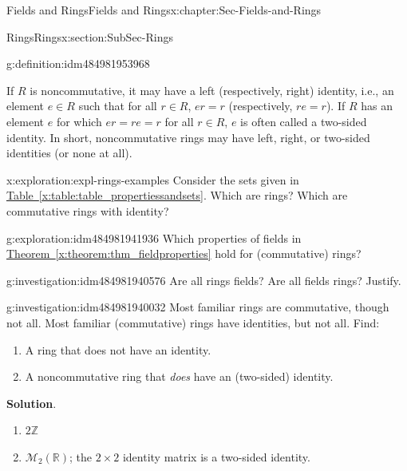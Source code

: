 \documentclass[oneside,10pt,]{book}
\newcommand{\blocktitlefont}{\relax}
\newcommand{\xreffont}{\relax}
\numberwithin{equation}{section}
\def\Z{{\mathbb Z}}
\def\R{{\mathbb R}}
\begin{document}
\begin{chapterptx}{Fields and Rings}{}{Fields and Rings}{}{}{x:chapter:Sec-Fields-and-Rings}
\begin{sectionptx}{Rings}{}{Rings}{}{}{x:section:SubSec-Rings}
\begin{definition}{}{g:definition:idm484981953968}
\end{definition}
If \(R\) is noncommutative, it may have a left (respectively, right) identity, i.e., an element \(e\in R\) such that for all \(r\in R\), \(er = r\) (respectively, \(re = r\)). If \(R\) has an element \(e\) for which \(er = re = r\) for all \(r\in R\), \(e\) is often called a two-sided identity. In short, noncommutative rings may have left, right, or two-sided identities (or none at all).%
\begin{exploration}{}{x:exploration:expl-rings-examples}%
Consider the sets given in \hyperref[x:table:table_propertiessandsets]{Table~{\xreffont\ref{x:table:table_propertiessandsets}}}. Which are rings? Which are commutative rings with identity?%
\end{exploration}
\begin{exploration}{}{g:exploration:idm484981941936}%
Which properties of fields in \hyperref[x:theorem:thm_fieldproperties]{Theorem~{\xreffont\ref{x:theorem:thm_fieldproperties}}} hold for (commutative) rings?%
\end{exploration}
\begin{investigation}{}{g:investigation:idm484981940576}%
Are all rings fields? Are all fields rings? Justify.%
\end{investigation}
\begin{investigation}{}{g:investigation:idm484981940032}%
Most familiar rings are commutative, though not all. Most familiar (commutative) rings have identities, but not all. Find:%
\begin{enumerate}
\item{}A ring that does not have an identity\footnotemark{}.%
\item{}A noncommutative ring that \emph{does} have an (two-sided) identity.%
\end{enumerate}
%
\par\smallskip%
\noindent\textbf{\blocktitlefont Solution}.\hypertarget{g:solution:idm484981940320}{}\quad{}%
\begin{enumerate}
\item{}\(2\Z\)%
\item{}\(\mathcal{M}_2(\R)\); the \(2\times 2\) identity matrix is a two-sided identity.%
\end{enumerate}
%
\end{investigation}
%

\end{sectionptx}
\end{chapterptx}
\end{document}
